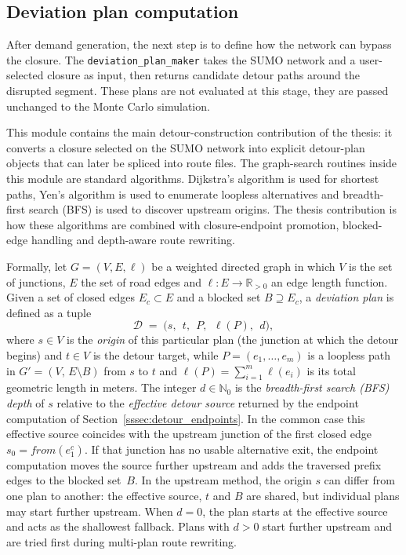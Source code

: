 \subsection{Deviation plan computation}
\label{subsec:deviation_plan_maker}

After demand generation, the next step is to define how the network can bypass
the closure. The \texttt{deviation\_plan\_maker} takes the SUMO network and a
user-selected closure as input, then returns candidate detour paths around the
disrupted segment. These plans are not evaluated at this stage, they are passed
unchanged to the Monte Carlo simulation.

This module contains the main detour-construction contribution of the thesis:
it converts a closure selected on the SUMO network into explicit detour-plan
objects that can later be spliced into route files. The graph-search routines
inside this module are standard algorithms. Dijkstra's algorithm is used for
shortest paths, Yen's algorithm is used to enumerate loopless alternatives and
breadth-first search (BFS) is used to discover upstream origins. The thesis
contribution is how these algorithms are combined with closure-endpoint
promotion, blocked-edge handling and depth-aware route rewriting.

Formally, let $G = (V, E, \ell)$ be a weighted directed graph in which $V$
is the set of junctions, $E$ the set of road edges and
$\ell : E \to \mathbb{R}_{>0}$ an edge length function. Given a set of
closed edges $E_c \subset E$ and a blocked set $B \supseteq E_c$, a
\emph{deviation plan} is defined as a tuple
\begin{equation}
  \mathcal{D} \;=\; \bigl(s,\;\, t,\;\, P,\;\, \ell(P),\;\, d\bigr),
  \label{eq:deviation_plan}
\end{equation}
where $s \in V$ is the \emph{origin} of this particular plan (the junction
at which the detour begins) and $t \in V$ is the detour target, while
$P = (e_1, \ldots, e_m)$ is a loopless path in $G' = (V,\, E \setminus B)$
from $s$ to $t$ and $\ell(P) = \sum_{i=1}^{m} \ell(e_i)$ is its total
geometric length in meters. The integer $d \in \mathbb{N}_0$ is the
\emph{breadth-first search (BFS) depth} of $s$ relative to the
\emph{effective detour source}
returned by the endpoint computation of
Section~\ref{sssec:detour_endpoints}. In the common case this effective
source coincides with the upstream junction of the first closed edge
$s_0 = \mathit{from}(e_1^c)$. If that junction has no usable alternative exit,
the endpoint computation moves the source further upstream and adds the
traversed prefix edges to the blocked set~$B$. In the upstream method, the
origin $s$ can differ from one plan to another: the effective source, $t$ and
$B$ are shared, but individual plans may start further upstream. When
$d = 0$, the plan starts at the effective source and acts as the shallowest
fallback. Plans with $d > 0$ start further upstream and are tried first during
multi-plan route rewriting.


